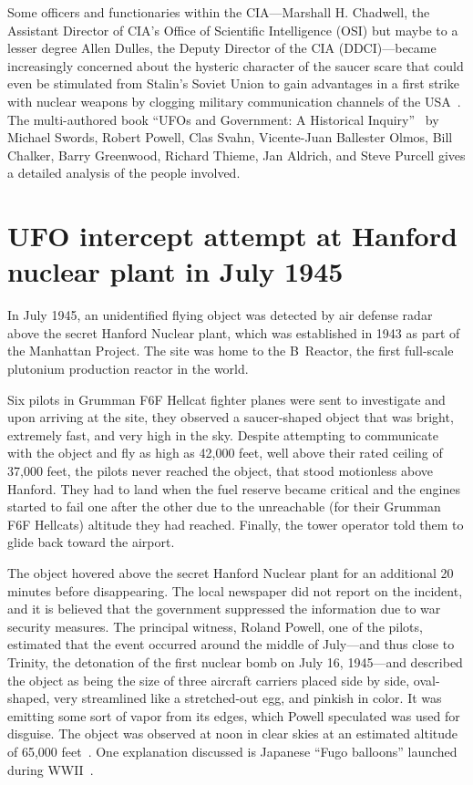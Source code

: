 Some officers and functionaries within the CIA---Marshall H.  Chadwell, the Assistant Director of CIA's Office of Scientific Intelligence (OSI)
but maybe to a lesser degree Allen Dulles, the
Deputy Director of the CIA (DDCI)---became increasingly concerned
about the hysteric character of the saucer scare that could even be stimulated from Stalin's Soviet Union to gain advantages in a
first strike with nuclear weapons by clogging military communication channels of the USA~\cite{Haines-CIA-UFO}.
The multi-authored book ``{UFO}s and Government: {A} Historical Inquiry''~\cite{Swords2012Jul}
by Michael Swords,  Robert Powell,  Clas Svahn, Vicente-Juan Ballester Olmos,
Bill Chalker,  Barry Greenwood,
Richard Thieme,  Jan Aldrich, and Steve Purcell gives a detailed analysis of the people involved.


\section{UFO intercept attempt at Hanford nuclear plant in July 1945}

\label{2023-UFO-part-History-chapter-post-1945-pre-1953-HP}

In July 1945, an unidentified flying object was detected by air defense radar above the secret Hanford Nuclear plant,
which was established in 1943 as part of the Manhattan Project.
The site was home to the B~Reactor, the first full-scale plutonium production reactor in the world.

Six pilots in Grumman F6F Hellcat fighter planes were sent to investigate and upon arriving at the site,
they observed a saucer-shaped object that was bright, extremely fast, and very high in the sky.
Despite attempting to communicate with the object and fly as high as 42,000 feet,
well above their rated ceiling of 37,000 feet, the pilots never reached the object,
that stood motionless above Hanford.
They had to land when the fuel reserve became critical and the engines started to fail one after the other due to the unreachable
(for their Grumman F6F Hellcats) altitude they had reached. Finally, the tower operator told them to glide back toward the airport.

The object hovered above the secret Hanford Nuclear plant for an additional 20 minutes before disappearing.
The local newspaper did not report on the incident, and it is believed that the government suppressed the information due to war security measures.
The principal witness, Roland Powell, one of the pilots, estimated that the event occurred around the middle of July---and
thus close to Trinity, the detonation of the first nuclear bomb on July 16, 1945---and described the object as being the size of three aircraft carriers placed side by side, oval-shaped, very streamlined like a stretched-out egg, and pinkish in color. It was emitting some sort of vapor from its edges, which Powell speculated was used for disguise. The object was observed at noon in clear skies at an estimated altitude of 65,000 feet~\cite{Adam2009Oct}. One explanation discussed is Japanese ``Fugo balloons'' launched during WWII~\cite{Gross2021Sep}.


